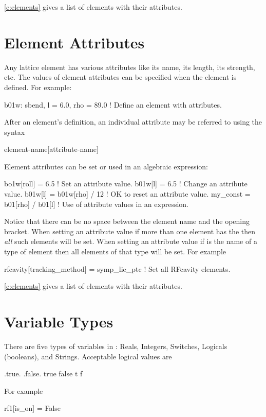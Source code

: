 {\cref{c:elements} gives a list of elements with their attributes.

\section{Element Attributes}

Any lattice element has various attributes like its name, its length,
its strength, etc. The values of element attributes can be specified
when the element is defined. For example:
\begin{example}
  b01w: sbend, l = 6.0, rho = 89.0 ! Define an element with attributes.
\end{example}
After an element's definition, an individual attribute may be referred
to using the syntax
\begin{example}
  element-name[attribute-name]
\end{example}
Element attributes can be set or used in an algebraic expression:
\begin{example}
  bo1w[roll] = 6.5                  ! Set an attribute value.
  b01w[l] = 6.5                     ! Change an attribute value.
  b01w[l] = b01w[rho] / 12          ! OK to reset an attribute value.
  my_const = b01[rho] / b01[l]      ! Use of attribute values in an expression.
\end{example}
Notice that there can be no space between the element name and the
\vn{[} opening bracket.  When setting an attribute value if more than
one element has the  then {\it all} such elements
will be set.  When setting an attribute value if  is
the name of a type of element then all elements of that type will be
set. For example
\begin{example}
  rfcavity[tracking_method] = symp_lie_ptc ! Set all RFcavity elements.
\end{example}

\cref{c:elements} gives a list of elements with their attributes.

\section{Variable Types}
\label{s:var_types}

There are five types of variables in \bmad: Reals, Integers, Switches,
Logicals (booleans), and Strings. Acceptable logical values are
\begin{example}
  .true.  .false.
   true    false
   t       f
\end{example}
For example
\begin{example}
  rf1[is_on] = False
\end{example}

}
